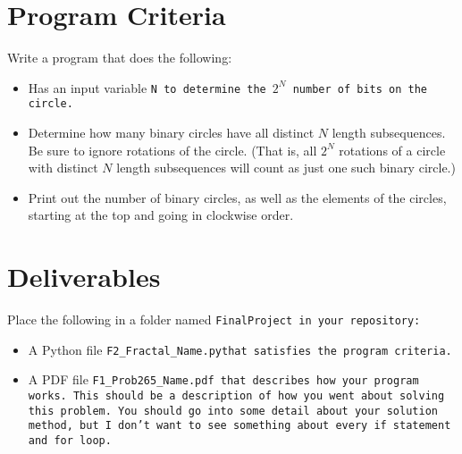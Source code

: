\documentclass{article}
\def\prog#1{
\vspace{.1in}\begin{mdframed} \begin{center} \textbf{Programming Reminders} \end{center}#1 \end{mdframed} }
\newcommand\foldername{\tt{FinalProject} }
\newcommand\filename{\tt{F2\_Fractal\_Name.py}\;\;}
\begin{document}
 	
 	
 	
 	
 	
 	

	
	
	
	
	
	
	
	




\section*{Program Criteria}
	Write a program that does the following:
	\begin{itemize}
		\item Has an input variable \tt{N} to determine the $2^N$ number of bits on the circle. 
		\item Determine how many binary circles have all distinct $N$ length subsequences.  Be sure to ignore rotations of the circle. (That is, all $2^N$ rotations of a circle with distinct $N$ length subsequences will count as just one such binary circle.)
		\item Print out the number of binary circles, as well as the elements of the circles, starting at the top and going in clockwise order.
	\end{itemize}







\section*{Deliverables}
	
	
	Place the following in a folder named \foldername in your repository:
	\begin{itemize}
		\item A Python file \filename  that satisfies the program criteria.
		\item A PDF file \tt{F1\_Prob265\_Name.pdf} that describes how your program works.  This should be a description of how you went about solving this problem.  You should go into some detail about your solution method, but I don't want to see something about every \tt{if} statement and \tt{for} loop.
	\end{itemize}

	
\end{document}
